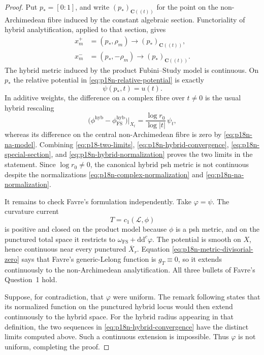\begin{proof}
Put \(p_*=[0:1]\), and write \((p_*)_{\mathbf C((t))}\) for the point
on the non-Archimedean fibre induced by the constant algebraic section.
Functoriality of hybrid analytification, applied to that section, gives
\[
\begin{aligned}
 x_m^+&=(p_*,\rho_m)\longrightarrow(p_*)_{\mathbf C((t))},\\
 x_m^-&=(p_*,-\rho_m)\longrightarrow(p_*)_{\mathbf C((t))}.
\end{aligned}
\tag{66.20x}\label{eq:p18n-hybrid-convergence}
\]
The hybrid metric induced by the product Fubini--Study model is
continuous.  On \(p_*\) the relative potential in
\eqref{eq:p18n-relative-potential} is exactly
\[
                         \psi(p_*,t)=u(t).
\tag{66.20y}\label{eq:p18n-special-section}
\]
In additive weights, the difference on a complex fibre over \(t\ne0\)
is the usual hybrid rescaling
\[
 \bigl(\phi^{\mathrm{hyb}}
       -\phi_{\mathrm{FS}}^{\mathrm{hyb}}\bigr)|_{X_t}
 =\frac{\log r_0}{\log|t|}\,\psi_t,
\tag{66.20z}\label{eq:p18n-hybrid-normalization}
\]
whereas its difference on the central non-Archimedean fibre is zero by
\eqref{eq:p18n-na-model}.  Combining
\eqref{eq:p18-two-limits}, \eqref{eq:p18n-hybrid-convergence},
\eqref{eq:p18n-special-section}, and
\eqref{eq:p18n-hybrid-normalization} proves the two limits in the
statement.  Since \(\log r_0\ne0\), the canonical hybrid psh metric is
not continuous despite the normalizations
\eqref{eq:p18n-complex-normalization} and
\eqref{eq:p18n-na-normalization}.

It remains to check Favre's formulation independently.  Take
\(\varphi=\psi\).  The curvature current
\[
                         T=c_1(\mathcal L,\phi)
\tag{66.20aa}\label{eq:p18n-favre-current}
\]
is positive and closed on the product model because \(\phi\) is a psh
metric, and on the punctured total space it restricts to
\(\omega_{\mathrm{FS}}+\mathrm d\mathrm d^c\varphi\).  The potential
is smooth on \(X\), hence continuous near every punctured
\(\overline X_r\).  Equation \eqref{eq:p18n-metric-divisorial-zero}
says that Favre's generic-Lelong function is \(g_T\equiv0\), so it
extends continuously to the non-Archimedean analytification.  All three
bullets of Favre's Question~1 hold.

Suppose, for contradiction, that \(\varphi\) were uniform.  The remark
following \cite[Definition~4.1]{Favre20Hybrid} states that its normalized
function on the punctured hybrid locus would then extend continuously to
the hybrid space.  For the hybrid radius appearing in that definition,
the two sequences in \eqref{eq:p18n-hybrid-convergence} have the distinct
limits computed above.  Such a continuous extension is impossible.  Thus
\(\varphi\) is not uniform, completing the proof.
\end{proof}
